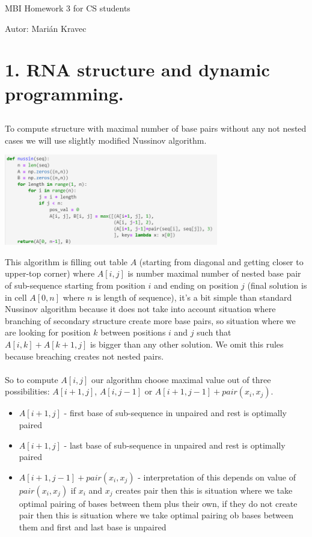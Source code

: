 \documentclass[a4paper]{article}
\begin{document}
 
	
	\pagestyle{plain}
	
	\begin{center}
		\sc\large
		MBI Homework 3 for CS students
	\end{center}
	
	Autor: Marián Kravec
	\section{1. RNA structure and dynamic programming.}
	
	\subsection{}
	
	
	To compute structure with maximal number of base pairs without any not nested cases we will use slightly modified Nussinov algorithm.
	
	\centerline{\includegraphics[width=0.7\textwidth]{nussin_1}}
	
	This algorithm is filling out table $A$ (starting from diagonal and getting closer to upper-top corner) where $A[i, j]$ is number maximal number of nested base pair of sub-sequence starting from position $i$ and ending on position $j$ (final solution is in cell $A[0, n]$ where $n$ is length of sequence), it's a bit simple than standard Nussinov algorithm because it does not take into account situation where branching of secondary structure create more base pairs, so situation where we are looking for position $k$ between positions $i$ and  $j$ such that $A[i, k]+A[k+1, j]$ is bigger than any other solution. We omit this rules because breaching creates not nested pairs.
	\\
	\\
	So to compute $A[i, j]$ our algorithm choose maximal value out of three possibilities: $A[i+1, j]$, $A[i, j-1]$ or $A[i+1, j-1]+pair(x_i, x_j)$. 
	\begin{itemize}
		\item{$A[i+1, j]$} - first base of sub-sequence in unpaired and rest is optimally paired 
		\item{$A[i+1, j]$} - last base of sub-sequence in unpaired and rest is optimally paired 
		\item{$A[i+1, j-1]+pair(x_i, x_j)$} - interpretation of this depends on value of $pair(x_i, x_j)$ if $x_i$ and $x_j$ creates pair then this is situation where we take optimal pairing of bases between them plus their own, if they do not create pair then this is situation where we take optimal pairing ob bases between them and first and last base is unpaired
	\end{itemize}
	
\end{document}
